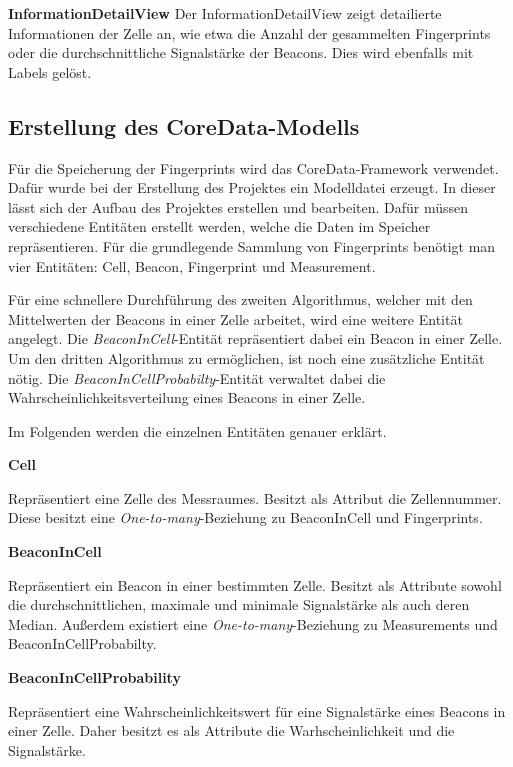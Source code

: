 \textbf{InformationDetailView}
Der InformationDetailView zeigt detailierte Informationen der Zelle an, wie etwa die Anzahl der gesammelten Fingerprints oder die durchschnittliche Signalstärke der Beacons.
Dies wird ebenfalls mit Labels gelöst.


\subsection{Erstellung des CoreData-Modells}
\label{sec:}
Für die Speicherung der Fingerprints wird das CoreData-Framework verwendet. Dafür wurde bei der Erstellung des Projektes ein Modelldatei erzeugt. In dieser lässt sich der Aufbau des Projektes erstellen und bearbeiten.
Dafür müssen verschiedene Entitäten erstellt werden, welche die Daten im Speicher repräsentieren.
Für die grundlegende Sammlung von Fingerprints benötigt man vier Entitäten: Cell, Beacon, Fingerprint und Measurement.

Für eine schnellere Durchführung des zweiten Algorithmus, welcher mit den Mittelwerten der Beacons in einer Zelle arbeitet, wird eine weitere Entität angelegt. Die \emph{BeaconInCell}-Entität repräsentiert dabei ein Beacon in einer Zelle.
Um den dritten Algorithmus zu ermöglichen, ist noch eine zusätzliche Entität nötig. Die \emph{BeaconInCellProbabilty}-Entität verwaltet dabei die Wahrscheinlichkeitsverteilung eines Beacons in einer Zelle.

Im Folgenden werden die einzelnen Entitäten genauer erklärt.


\textbf{Cell}

Repräsentiert eine Zelle des Messraumes. Besitzt als Attribut die Zellennummer.
Diese besitzt eine \emph{One-to-many}-Beziehung zu BeaconInCell und Fingerprints.


\textbf{BeaconInCell}

Repräsentiert ein Beacon in einer bestimmten Zelle. Besitzt als Attribute sowohl die durchschnittlichen, maximale und minimale Signalstärke als auch deren Median.
Außerdem existiert eine \emph{One-to-many}-Beziehung zu Measurements und BeaconInCellProbabilty.



\textbf{BeaconInCellProbability}

Repräsentiert eine Wahrscheinlichkeitswert für eine Signalstärke eines Beacons in einer Zelle.
Daher besitzt es als Attribute die Warhscheinlichkeit und die Signalstärke.

